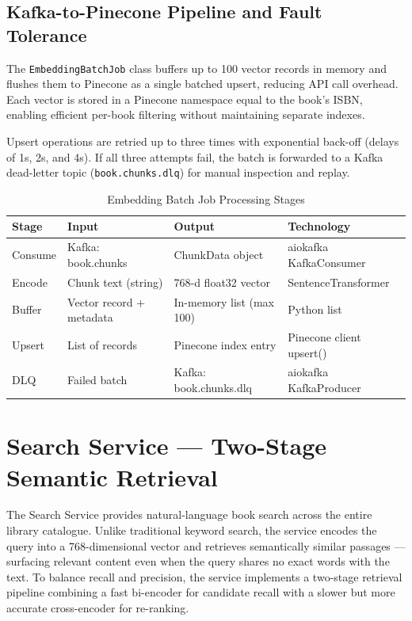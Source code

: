 \subsection{Kafka-to-Pinecone Pipeline and Fault Tolerance}

The \texttt{EmbeddingBatchJob} class buffers up to 100 vector records in
memory and flushes them to Pinecone as a single batched upsert, reducing API
call overhead. Each vector is stored in a Pinecone namespace equal to the
book's ISBN, enabling efficient per-book filtering without maintaining
separate indexes.

Upsert operations are retried up to three times with exponential back-off
(delays of 1s, 2s, and 4s). If all three attempts fail, the batch is
forwarded to a Kafka dead-letter topic (\texttt{book.chunks.dlq}) for manual
inspection and replay.

\begin{table}[H]
\centering
\caption{Embedding Batch Job Processing Stages}
\label{tab:embedbatch}
\begin{tabularx}{\textwidth}{|l|l|l|X|}
\hline
\textbf{Stage} & \textbf{Input} & \textbf{Output} & \textbf{Technology} \\
\hline
Consume & Kafka: book.chunks      & ChunkData object         & aiokafka KafkaConsumer \\
\hline
Encode  & Chunk text (string)     & 768-d float32 vector     & SentenceTransformer \\
\hline
Buffer  & Vector record + metadata & In-memory list (max 100) & Python list \\
\hline
Upsert  & List of records         & Pinecone index entry     & Pinecone client upsert() \\
\hline
DLQ     & Failed batch            & Kafka: book.chunks.dlq   & aiokafka KafkaProducer \\
\hline
\end{tabularx}
\end{table}

\section{Search Service --- Two-Stage Semantic Retrieval}
\label{sec:search}

The Search Service provides natural-language book search across the entire
library catalogue. Unlike traditional keyword search, the service encodes the
query into a 768-dimensional vector and retrieves semantically similar passages
--- surfacing relevant content even when the query shares no exact words with
the text. To balance recall and precision, the service implements a two-stage
retrieval pipeline combining a fast bi-encoder for candidate recall with a
slower but more accurate cross-encoder for re-ranking.

